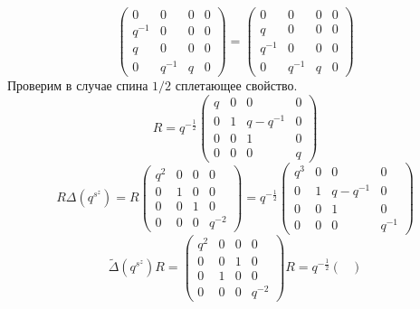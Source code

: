 \documentclass[12pt]{article}
\theoremstyle{definition}
\begin{document}
\begin{enumerate}
\begin{equation}
\begin{pmatrix}
            0 & 0 & 0 & 0\\
            q^{-1} & 0 & 0 & 0\\
            q & 0 & 0 & 0\\
            0 & q^{-1} & q & 0
        \end{pmatrix}=\begin{pmatrix}
            0 & 0 & 0 & 0\\
            q & 0 & 0 & 0\\
            q^{-1} & 0 & 0 & 0\\
            0 & q^{-1} & q & 0
        \end{pmatrix}
    \end{equation}
    Проверим в случае спина $1/2$ сплетающее свойство.
    \begin{equation}
        R=q^{-\frac{1}{2}}\begin{pmatrix}
            q & 0 & 0 & 0\\
            0 & 1 & q-q^{-1} & 0\\
            0 & 0 & 1 & 0\\
            0 & 0 & 0 & q
        \end{pmatrix}
    \end{equation}
    \begin{equation}
        R\Delta(q^{s^z})=R\begin{pmatrix}
            q^2 & 0 & 0 & 0\\
            0 & 1 & 0 & 0\\
            0 & 0 & 1 & 0\\
            0 & 0 & 0 & q^{-2}
        \end{pmatrix}=q^{-\frac{1}{2}}\begin{pmatrix}
            q^3 & 0 & 0 & 0\\
            0 & 1 & q-q^{-1} & 0\\
            0 & 0 & 1 & 0\\
            0 & 0 & 0 & q^{-1}
        \end{pmatrix}
    \end{equation}
    \begin{equation}
        \tilde\Delta(q^{s^z})R=\begin{pmatrix}
            q^2 & 0 & 0 & 0\\
            0 & 0 & 1 & 0\\
            0 & 1 & 0 & 0\\
            0 & 0 & 0 & q^{-2}
        \end{pmatrix}R=q^{-\frac{1}{2}}\begin{pmatrix}

\end{pmatrix}
\end{equation}
\end{enumerate}
\end{document}
